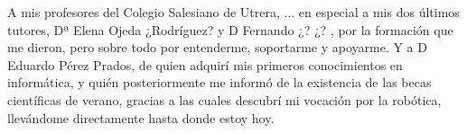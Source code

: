 A mis profesores del Colegio Salesiano de Utrera, ...
en especial a mis dos últimos tutores, Dª Elena Ojeda ¿Rodríguez? y D Fernando ¿? ¿? , por la formación que me dieron, pero sobre todo por entenderme, soportarme y apoyarme. Y a D Eduardo Pérez Prados, de quien adquirí mis primeros conocimientos en informática, y quién posteriormente me informó de la existencia de las becas científicas de verano, gracias a las cuales descubrí mi vocación por la robótica, llevándome directamente hasta donde estoy hoy.

{}%
\vspace{-.3cm}
{}%
{}%
